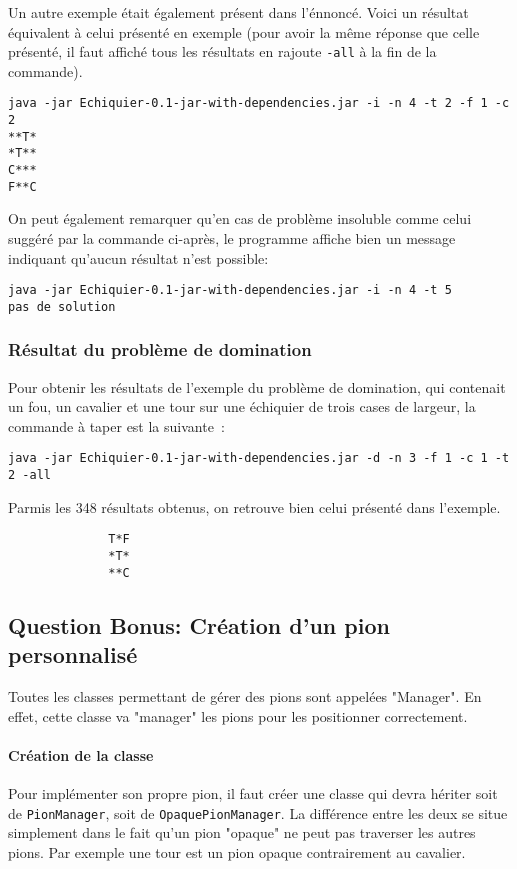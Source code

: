 \documentclass[a4paper,11pt]{article}
\begin{document}
            Un autre exemple était également présent dans l'énnoncé.  Voici un résultat équivalent à celui présenté en exemple (pour avoir la même réponse que celle présenté, il faut affiché tous les résultats en rajoute \verb|-all| à la fin de la commande).
            \begin{verbatim}
java -jar Echiquier-0.1-jar-with-dependencies.jar -i -n 4 -t 2 -f 1 -c 2
**T*
*T**
C***
F**C
            \end{verbatim}
            On peut également remarquer qu'en cas de problème insoluble comme celui suggéré par la commande ci-après, le programme affiche bien un message indiquant qu'aucun résultat n'est possible:
            \begin{verbatim}
java -jar Echiquier-0.1-jar-with-dependencies.jar -i -n 4 -t 5
pas de solution
            \end{verbatim}
            
        \subsubsection{Résultat du problème de domination}
            Pour obtenir les résultats de l'exemple du problème de domination, qui contenait un fou, un cavalier et une tour sur une échiquier de trois cases de largeur, la commande à taper est la suivante~:
            \begin{verbatim}
java -jar Echiquier-0.1-jar-with-dependencies.jar -d -n 3 -f 1 -c 1 -t 2 -all
            \end{verbatim}
            Parmis les 348 résultats obtenus, on retrouve bien celui présenté dans l'exemple.
            \begin{verbatim}
              T*F
              *T*
              **C
            \end{verbatim}
        
    \subsection{Question Bonus: Création d'un pion personnalisé}
        Toutes les classes permettant de gérer des pions sont appelées "Manager".  En effet, cette classe va "manager" les pions pour les positionner correctement.

        \paragraph{Création de la classe}
            Pour implémenter son propre pion, il faut créer une classe qui devra hériter soit de \verb|PionManager|, soit de \verb|OpaquePionManager|. La différence entre les deux se situe simplement dans le fait qu'un pion "opaque" ne peut pas traverser les autres pions. Par exemple une tour est un pion opaque contrairement au cavalier.\\
\end{document}
